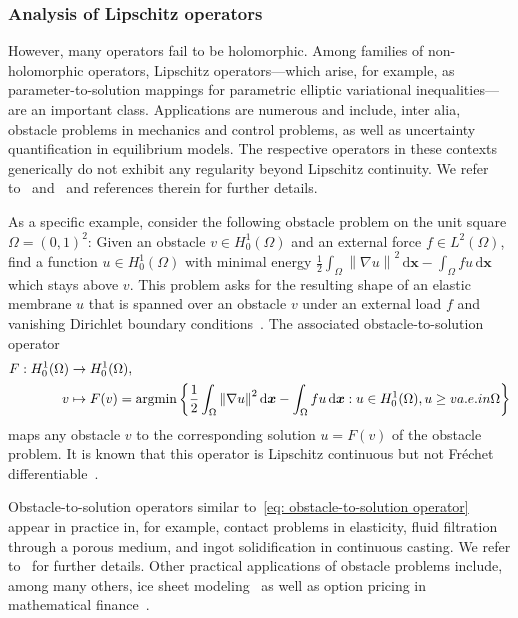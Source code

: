 \documentclass[namedate,webpdf]{ima-authoring-template-blank}
\newcommand*{\argmin}[1]{{\underset{#1}{\operatorname{argmin}}}}
\def\D{\,\mathrm{d}}
\newcommand*{\nm}[1]{{\left\|#1\right \|}}
\numberwithin{counter}{section}
\numberwithin{equation}{section}
\theoremstyle{plain}
\theoremstyle{definition}
\theoremstyle{thmstyletwo}
\begin{document}
\subsubsection{Analysis of Lipschitz operators}

However, many operators fail to be holomorphic. Among families of non-holomorphic operators, Lipschitz operators---which arise, for example, as parameter-to-solution mappings for parametric elliptic variational inequalities---are an important class. Applications are numerous and include, inter alia, obstacle problems in mechanics and control problems, as well as uncertainty quantification in equilibrium models. The respective operators in these contexts generically do not exhibit any regularity beyond Lipschitz continuity. We refer to~\citet{schwab_DeepOperatorNetworkApproximation_2026} and~\citet[Ch. 6]{gwinner_UncertaintyQuantificationVariationalInequalities_2021} and references therein for further details.

As a specific example, consider the following obstacle problem on the unit square \( \Omega = (0,1)^2 \): Given an obstacle \( v \in H_0^1(\Omega) \) and an external force \( f \in L^2(\Omega) \), find a function \( u \in H_0^1(\Omega) \) with minimal energy \( \frac{1}{2} \int_{\Omega} \nm{ \nabla u }^2 \D \bm{x} - \int_{\Omega} f u \D \bm{x} \) which stays above \( v \). This problem asks for the resulting shape of an elastic membrane \( u \) that is spanned over an obstacle \( v \) under an external load \( f \) and vanishing Dirichlet boundary conditions~\citep[Ch. 1]{rodrigues_ObstacleProblemsMathematicalPhysics_1987}. The associated obstacle-to-solution operator
\begin{align}
\label{eq: obstacle-to-solution operator}
\begin{split}
    F :  H_0^1(\Omega) &\to H_0^1(\Omega), \\
         v & \mapsto F(v) = \argmin{} \left\{ \frac{1}{2} \int_{\Omega} \nm{\nabla u}^2 \D \bm{x} - \int_{\Omega} f u \D \bm{x} : u \in H_0^1(\Omega), u \geq v \textup{ a.e. in } \Omega \right\}
\end{split}
\end{align}
maps any obstacle \( v \) to the corresponding solution \( u = F(v) \) of the obstacle problem. It is known that this operator is Lipschitz continuous but not Fréchet differentiable~\citep{mignot_ControleDansInequationsVariationelles_1976}.

Obstacle-to-solution operators similar to~\eqref{eq: obstacle-to-solution operator} appear in practice in, for example, contact problems in elasticity, fluid filtration through a porous medium, and ingot solidification in continuous casting. We refer to~\citet{rodrigues_ObstacleProblemsMathematicalPhysics_1987} for further details. Other practical applications of obstacle problems include, among many others, ice sheet modeling~\citep{jouvet_SteadyShallowIceSheets_2012} as well as option pricing in mathematical finance~\citep{jaillet_VariationalInequalitiesPricingAmerican_1990}.
\end{document}
